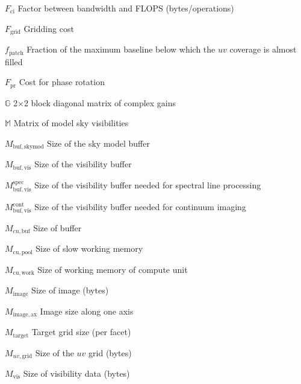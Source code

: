 \documentclass[11pt,a4paper]{article}
\newcommand{\fci}{F_{\mathrm{ci}}} %
\newcommand{\fgrid}{F_{\mathrm{grid}}} %
\newcommand{\fpatch}{f_\mathrm{patch}} %
\newcommand{\fpr}{F_\mathrm{pr}} %
\newcommand{\gainm}{\mathbb{G}} %
\newcommand{\modskyvism}{\mathbb{M}} %
\newcommand{\skymodbufsize}{M_\mathrm{buf,skymod}} %
\newcommand{\visbufsize}{M_\mathrm{buf,vis}} %
\newcommand{\visbufsizespec}{M^\mathrm{spec}_\mathrm{buf,vis}} %
\newcommand{\visbufsizecont}{M^\mathrm{cont}_\mathrm{buf,vis}} %
\newcommand{\bufsize}{M_\mathrm{cu,buf}} %
\newcommand{\slowmemsize}{M_\mathrm{cu,pool}} %
\newcommand{\cumemsize}{M_\mathrm{cu,work}} %
\newcommand{\imgsize}{M_\mathrm{image}} %
\newcommand{\imgsizeoneax}{M_\mathrm{image,ax}}	%
\newcommand{\targgridsize}{M_\mathrm{target}} %
\newcommand{\uvgridsize}{M_{uv,\mathrm{grid}}} %
\newcommand{\vissize}{M_\mathrm{vis}} %
\newcommand{\uv}{uv} %
\begin{document}
\begin{basedescript}{\desclabelstyle{\pushlabel}\desclabelwidth{6em}}
\item[$\fci$] Factor between bandwidth and FLOPS (bytes/operations)\vspace{-0.2cm}
\item[$\fgrid$] Gridding cost\vspace{-0.2cm}
\item[$\fpatch$] Fraction of the maximum baseline below which the $\uv$
  coverage is almost filled\vspace{-0.2cm}
\item[$\fpr$] Cost for phase rotation\vspace{-0.2cm}
\item[$\gainm$] 2$\times$2 block diagonal matrix of complex
  gains\vspace{-0.2cm}
\item[$\modskyvism$] Matrix of model sky visibilities\vspace{-0.2cm}
\item[$\skymodbufsize$] Size of the sky model buffer\vspace{-0.2cm}
\item[$\visbufsize$] Size of the visibility buffer \vspace{-0.2cm}
\item[$\visbufsizespec$] Size of the visibility buffer needed for spectral line processing\vspace{-0.2cm}
\item[$\visbufsizecont$] Size of the visibility buffer needed for continuum imaging\vspace{-0.2cm}
\item[$\bufsize$] Size of buffer \vspace{-0.2cm}
\item[$\slowmemsize$] Size of slow working memory \vspace{-0.2cm}
\item[$\cumemsize$] Size of working memory of compute unit \vspace{-0.2cm}
\item[$\imgsize$] Size of image (bytes) \vspace{-0.2cm}
\item[$\imgsizeoneax$] Image size along one axis \vspace{-0.2cm}
\item[$\targgridsize$] Target grid size (per facet) \vspace{-0.2cm}
\item[$\uvgridsize$] Size of the $\uv$ grid (bytes) \vspace{-0.2cm}
\item[$\vissize$] Size of visibility data (bytes) \vspace{-0.2cm}

\end{basedescript}
\end{document}
